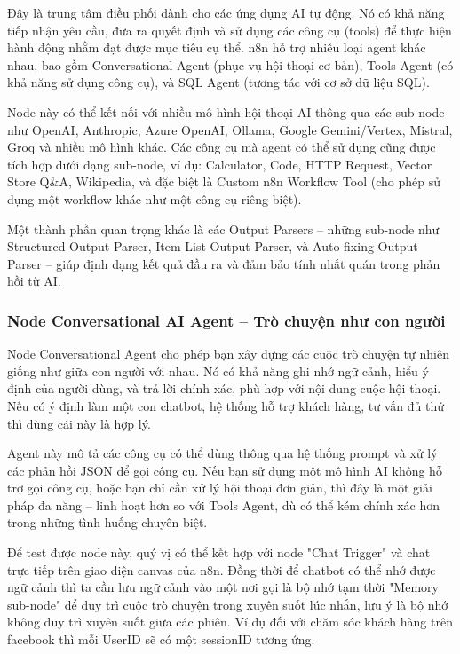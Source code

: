 Đây là trung tâm điều phối dành cho các ứng dụng AI tự động. Nó có khả năng tiếp nhận yêu cầu, đưa ra quyết định và sử dụng các công cụ (tools) để thực hiện hành động nhằm đạt được mục tiêu cụ thể. n8n hỗ trợ nhiều loại agent khác nhau, bao gồm Conversational Agent (phục vụ hội thoại cơ bản), Tools Agent (có khả năng sử dụng công cụ), và SQL Agent (tương tác với cơ sở dữ liệu SQL).


Node này có thể kết nối với nhiều mô hình hội thoại AI thông qua các sub-node như OpenAI, Anthropic, Azure OpenAI, Ollama, Google Gemini/Vertex, Mistral, Groq và nhiều mô hình khác. Các công cụ mà agent có thể sử dụng cũng được tích hợp dưới dạng sub-node, ví dụ: Calculator, Code, HTTP Request, Vector Store Q\&A, Wikipedia, và đặc biệt là Custom n8n Workflow Tool (cho phép sử dụng một workflow khác như một công cụ riêng biệt).

Một thành phần quan trọng khác là các Output Parsers – những sub-node như Structured Output Parser, Item List Output Parser, và Auto-fixing Output Parser – giúp định dạng kết quả đầu ra và đảm bảo tính nhất quán trong phản hồi từ AI.

\subsubsection{Node Conversational AI Agent – Trò chuyện như con người}
Node Conversational Agent cho phép bạn xây dựng các cuộc trò chuyện tự nhiên giống như giữa con người với nhau. Nó có khả năng ghi nhớ ngữ cảnh, hiểu ý định của người dùng, và trả lời chính xác, phù hợp với nội dung cuộc hội thoại. Nếu có ý định làm một con chatbot, hệ thống hỗ trợ khách hàng, tư vấn đủ thứ thì dùng cái này là hợp lý.


Agent này mô tả các công cụ có thể dùng thông qua hệ thống prompt và xử lý các phản hồi JSON để gọi công cụ. Nếu bạn sử dụng một mô hình AI không hỗ trợ gọi công cụ, hoặc bạn chỉ cần xử lý hội thoại đơn giản, thì đây là một giải pháp đa năng – linh hoạt hơn so với Tools Agent, dù có thể kém chính xác hơn trong những tình huống chuyên biệt.

Để test được node này, quý vị có thể kết hợp với node "Chat Trigger" và chat trực tiếp trên giao diện canvas của n8n. Đồng thời để chatbot có thể nhớ được ngữ cảnh thì ta cần lưu ngữ cảnh vào một nơi gọi là bộ nhớ tạm thời "Memory sub-node" để duy trì cuộc trò chuyện trong xuyên suốt lúc nhắn, lưu ý là bộ nhớ không duy trì xuyên suốt giữa các phiên. Ví dụ đối với chăm sóc khách hàng trên facebook thì mỗi UserID sẽ có một sessionID tương ứng. 


